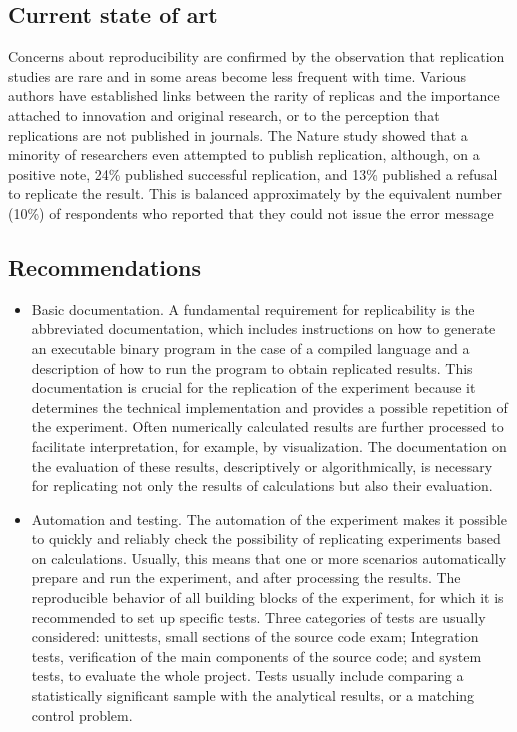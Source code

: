 \subsection{Current state of art}
Concerns about reproducibility are confirmed by the observation that replication studies are rare and in some areas become less frequent with time. Various authors have established links between the rarity of replicas and the importance attached to innovation and original research, or to the perception that replications are not published in journals. The Nature study showed that a minority of researchers even attempted to publish replication, although, on a positive note, 24\% published successful replication, and 13\% published a refusal to replicate the result. This is balanced approximately by the equivalent number (10\%) of respondents who reported that they could not issue the error message\cite{DBLP:conf/kolicalling/AhadiHIKP16}
\subsection{Recommendations}
\begin{itemize}
    \item Basic documentation. A fundamental requirement for replicability is the abbreviated documentation, which includes instructions on how to generate an executable binary program in the case of a compiled language and a description of how to run the program to obtain replicated results. This documentation is crucial for the replication of the experiment because it determines the technical implementation and provides a possible repetition of the experiment. Often numerically calculated results are further processed to facilitate interpretation, for example, by visualization. The documentation on the evaluation of these results, descriptively or algorithmically, is necessary for replicating not only the results of calculations but also their evaluation.
    \item Automation and testing. The automation of the experiment makes it possible to quickly and reliably check the possibility of replicating experiments based on calculations. Usually, this means that one or more scenarios automatically prepare and run the experiment, and after processing the results. The reproducible behavior of all building blocks of the experiment, for which it is recommended to set up specific tests. Three categories of tests are usually considered: unittests, small sections of the source code exam; Integration tests, verification of the main components of the source code; and system tests, to evaluate the whole project. Tests usually include comparing a statistically significant sample with the analytical results, or a matching control problem\cite{DBLP:journals/corr/FehrHHS16}.
\end{itemize}

